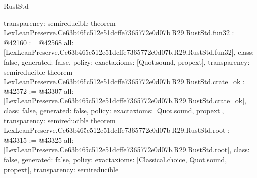 \begin{lexlean}{RustStd}
\begin{coremodule}
{  transparency: semireducible
}
theorem LexLeanPreserve.Ce63b465c512e51dcffe7365772e0d07b.R29.RustStd.fun32 : @42160 := @42568 {
  all: [LexLeanPreserve.Ce63b465c512e51dcffe7365772e0d07b.R29.RustStd.fun32],
  class: false,
  generated: false,
  policy: exact{axioms: [Quot.sound, propext]},
  transparency: semireducible
}
theorem LexLeanPreserve.Ce63b465c512e51dcffe7365772e0d07b.R29.RustStd.crate_ok : @42572 := @43307 {
  all: [LexLeanPreserve.Ce63b465c512e51dcffe7365772e0d07b.R29.RustStd.crate_ok],
  class: false,
  generated: false,
  policy: exact{axioms: [Quot.sound, propext]},
  transparency: semireducible
}
theorem LexLeanPreserve.Ce63b465c512e51dcffe7365772e0d07b.R29.RustStd.root : @43315 := @43325 {
  all: [LexLeanPreserve.Ce63b465c512e51dcffe7365772e0d07b.R29.RustStd.root],
  class: false,
  generated: false,
  policy: exact{axioms: [Classical.choice, Quot.sound, propext]},
  transparency: semireducible
}


\end{coremodule}
\end{lexlean}
